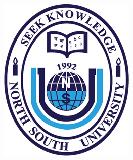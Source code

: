 \documentclass[a4paper,11pt]{paper}
\begin{document}
\begin{figure}
\centering
\includegraphics[scale=.3]{NSUlogo}
\end{figure}
\end{document}
